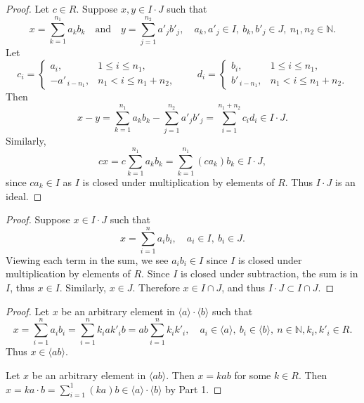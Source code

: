 \begin{proof}
    Let $c \in R$.  
    Suppose $x, y \in I \cdot J$ such that 
    \[
    x = \sum_{k = 1}^{n_1} a_k b_k \quad \text{and} \quad 
    y = \sum_{j = 1}^{n_2} a'_j b'_j, 
    \quad a_k, a'_j \in I, \ b_k, b'_j \in J, \ n_1, n_2 \in \mathbb{N}.
    \]
    Let
    \[
    c_i =
    \begin{cases}
    a_i, & 1 \le i \le n_1, \\
    - a'_{\,i-n_1}, & n_1 < i \le n_1 + n_2,
    \end{cases}
    \qquad
    d_i =
    \begin{cases}
    b_i, & 1 \le i \le n_1, \\
    b'_{\,i-n_1}, & n_1 < i \le n_1 + n_2.
    \end{cases}
    \]
    Then 
    \[
    x - y
    = \sum_{k = 1}^{n_1} a_k b_k - \sum_{j = 1}^{n_2} a'_j b'_j
    = \sum_{i = 1}^{n_1 + n_2} c_i d_i \in I \cdot J.
    \]
    Similarly,
    \[
    cx = c \sum_{k = 1}^{n_1} a_k b_k = \sum_{k = 1}^{n_1} (c a_k) b_k \in I \cdot J,
    \]
    since $c a_k \in I$ as $I$ is closed under multiplication by elements of $R$.
    Thus $I \cdot J$ is an ideal.
\end{proof}

\begin{proof}
    Suppose $x \in I \cdot J$ such that 
    \[
        x = \sum_{i = 1}^{n} a_i b_i, \quad a_i \in I,\ b_i \in J.
    \]
    Viewing each term in the sum, we see $a_i b_i \in I$ since $I$ is closed under multiplication by elements of $R$.
    Since $I$ is closed under subtraction, the sum is in $I$, thus $x \in I$.
    Similarly, $x \in J$.
    Therefore $x \in I \cap J$, and thus $I \cdot J \subset I \cap J$.
\end{proof}

\begin{proof}
    Let $x$ be an arbitrary element in $\langle a \rangle \cdot \langle b \rangle$ such that 
    \[
        x = \sum_{i = 1}^{n} a_i b_i = \sum_{i = 1}^{n} k_i a k'_i b = ab \sum_{i = 1}^{n} k_i k'_i, 
        \quad a_i \in \langle a \rangle, \ b_i \in \langle b \rangle, \ n \in \mathbb{N}, k_i, k'_i \in R.
    \]
    Thus $x \in \langle ab \rangle$.

    Let $x$ be an arbitrary element in $\langle ab \rangle$.
    Then $x = k ab$ for some $k \in R$.
    Then $x = k a \cdot b = \sum_{i = 1}^{1} (k a) b \in \langle a \rangle \cdot \langle b \rangle$ by Part 1.
\end{proof}

